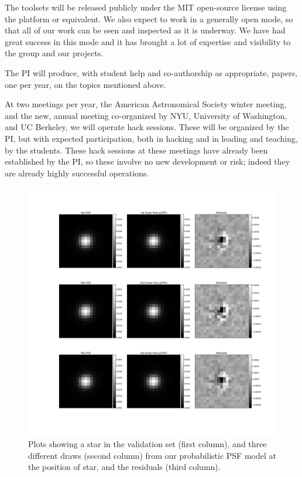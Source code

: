 \documentclass[12pt]{article}
\begin{document}
The toolsets will be released publicly under the MIT open-source
license using the platform  or equivalent.
We also expect to work in a generally open mode, so that all of our
work can be seen and inspected as it is underway.
We have had great success in this mode and it has brought a lot of
expertise and visibility to the group and our projects.

The PI will produce, with student help and co-authorship as
appropriate,  papers, one per year, on
the topics mentioned above.

At two meetings per year, the American Astronomical Society winter
meeting, and the new, annual  meeting
co-organized by NYU, University of Washington, and UC Berkeley, we
will operate hack sessions.  These will be organized by the PI, but
with expected participation, both in hacking and in leading and
teaching, by the students.
These hack sessions at these meetings have already been established by
the PI, so these involve no new development or risk; indeed they are
already highly successful operations.

\clearpage

\begin{figure}[!htb]
  \includegraphics[width=\linewidth]{112.png}
\endminipage
\caption{Plots showing a star in the validation set
(first column), and three different draws (second column)
from our probabilistic PSF model at the
position of star, and the residuals (third column).\label{1}}
\end{figure}
\end{document}
